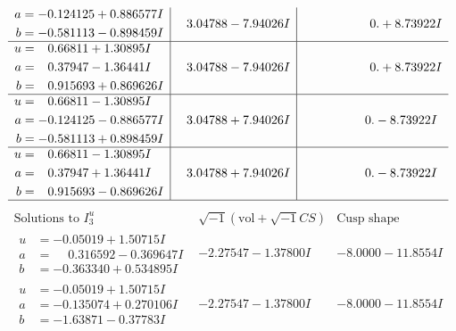 \documentclass[1p]{elsarticle_modified}
\theoremstyle{definition}
\newcommand{\I}{\sqrt{-1}}
\begin{document}
$$\begin{array}{c|c|c}
\begin{aligned}
a &= -0.124125 + 0.886577 I \\
b &= -0.581113 - 0.898459 I\end{aligned}
 & \phantom{-}3.04788 - 7.94026 I & \phantom{-0.000000 -}0. + 8.73922 I \\ \hline\begin{aligned}
u &= \phantom{-}0.66811 + 1.30895 I \\
a &= \phantom{-}0.37947 - 1.36441 I \\
b &= \phantom{-}0.915693 + 0.869626 I\end{aligned}
 & \phantom{-}3.04788 - 7.94026 I & \phantom{-0.000000 -}0. + 8.73922 I \\ \hline\begin{aligned}
u &= \phantom{-}0.66811 - 1.30895 I \\
a &= -0.124125 - 0.886577 I \\
b &= -0.581113 + 0.898459 I\end{aligned}
 & \phantom{-}3.04788 + 7.94026 I & \phantom{-0.000000 } 0. - 8.73922 I \\ \hline\begin{aligned}
u &= \phantom{-}0.66811 - 1.30895 I \\
a &= \phantom{-}0.37947 + 1.36441 I \\
b &= \phantom{-}0.915693 - 0.869626 I\end{aligned}
 & \phantom{-}3.04788 + 7.94026 I & \phantom{-0.000000 } 0. - 8.73922 I\\
 \hline 
 \end{array}$$\newpage$$\begin{array}{c|c|c}  
\text{Solutions to }I^u_{3}& \I (\text{vol} + \sqrt{-1}CS) & \text{Cusp shape}\\
 \hline 
\begin{aligned}
u &= -0.05019 + 1.50715 I \\
a &= \phantom{-}0.316592 - 0.369647 I \\
b &= -0.363340 + 0.534895 I\end{aligned}
 & -2.27547 - 1.37800 I & -8.0000 - 11.8554 I \\ \hline\begin{aligned}
u &= -0.05019 + 1.50715 I \\
a &= -0.135074 + 0.270106 I \\
b &= -1.63871 - 0.37783 I\end{aligned}
 & -2.27547 - 1.37800 I & -8.0000 - 11.8554 I \\ \hline\begin{aligned}

\end{aligned}
\end{array}$$
\end{document}
